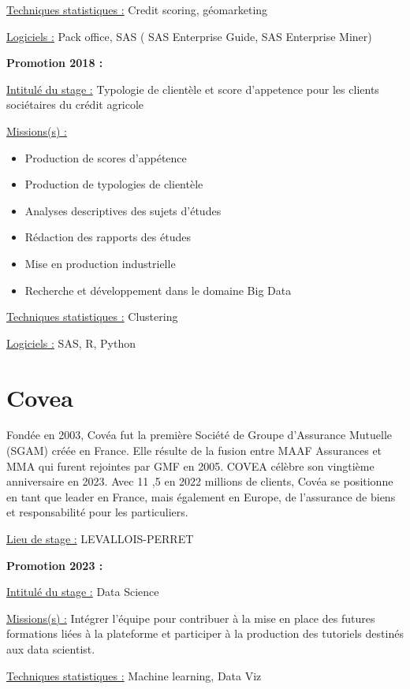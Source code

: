 \documentclass[
  letterpaper,
  DIV=11,
  numbers=noendperiod]{scrreprt}
\begin{document}
\uline{Techniques statistiques :} Credit scoring, géomarketing

\uline{Logiciels :} Pack office, SAS ( SAS Enterprise Guide, SAS
Enterprise Miner)

\textbf{Promotion 2018 :}

\uline{Intitulé du stage :} Typologie de clientèle et score d'appetence
pour les clients sociétaires du crédit agricole

\uline{Missions(s) :}

\begin{itemize}
\item
  Production de scores d'appétence
\item
  Production de typologies de clientèle
\item
  Analyses descriptives des sujets d'études
\item
  Rédaction des rapports des études
\item
  Mise en production industrielle
\item
  Recherche et développement dans le domaine Big Data
\end{itemize}

\uline{Techniques statistiques :} Clustering

\uline{Logiciels :} SAS, R, Python

\hypertarget{covea}{%
\section{\texorpdfstring{\textbf{Covea}}{Covea}}\label{covea}}

Fondée en 2003, Covéa fut la première Société de Groupe d'Assurance
Mutuelle (SGAM) créée en France. Elle résulte de la fusion entre MAAF
Assurances et MMA qui furent rejointes par GMF en 2005. COVEA célèbre
son vingtième anniversaire en 2023. Avec 11 ,5 en 2022 millions de
clients, Covéa se positionne en tant que leader en France, mais
également en Europe, de l'assurance de biens et responsabilité pour les
particuliers.

\uline{Lieu de stage :} LEVALLOIS-PERRET

\textbf{Promotion 2023 :}

\uline{Intitulé du stage :} Data Science

\uline{Missions(s) :} Intégrer l'équipe pour contribuer à la mise en
place des futures formations liées à la plateforme et participer à la
production des tutoriels destinés aux data scientist.

\uline{Techniques statistiques :} Machine learning, Data Viz
\end{document}

